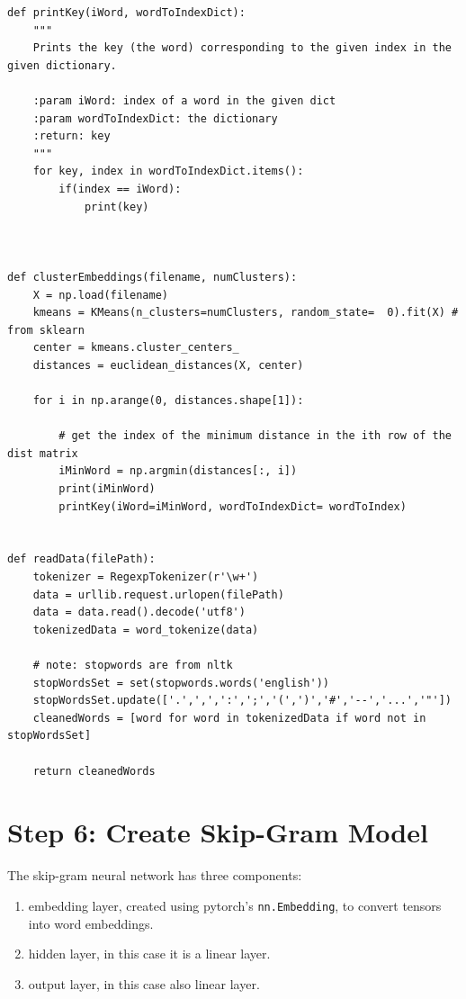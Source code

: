 \documentclass[
]{article}
\providecommand{\tightlist}{%
  \setlength{\itemsep}{0pt}\setlength{\parskip}{0pt}}
\begin{document}
\begin{verbatim}
def printKey(iWord, wordToIndexDict):
    """
    Prints the key (the word) corresponding to the given index in the given dictionary.

    :param iWord: index of a word in the given dict
    :param wordToIndexDict: the dictionary
    :return: key
    """
    for key, index in wordToIndexDict.items():
        if(index == iWord):
            print(key)



def clusterEmbeddings(filename, numClusters):
    X = np.load(filename)
    kmeans = KMeans(n_clusters=numClusters, random_state=  0).fit(X) # from sklearn
    center = kmeans.cluster_centers_
    distances = euclidean_distances(X, center)

    for i in np.arange(0, distances.shape[1]):

        # get the index of the minimum distance in the ith row of the dist matrix
        iMinWord = np.argmin(distances[:, i])
        print(iMinWord)
        printKey(iWord=iMinWord, wordToIndexDict= wordToIndex)


def readData(filePath):
    tokenizer = RegexpTokenizer(r'\w+')
    data = urllib.request.urlopen(filePath)
    data = data.read().decode('utf8')
    tokenizedData = word_tokenize(data)

    # note: stopwords are from nltk
    stopWordsSet = set(stopwords.words('english'))
    stopWordsSet.update(['.',',',':',';','(',')','#','--','...','"'])
    cleanedWords = [word for word in tokenizedData if word not in stopWordsSet]

    return cleanedWords
\end{verbatim}

\hypertarget{step-6-create-skip-gram-model}{%
\section{Step 6: Create Skip-Gram
Model}\label{step-6-create-skip-gram-model}}

The skip-gram neural network has three components:

\begin{enumerate}
\def\labelenumi{\arabic{enumi}.}
\tightlist
\item
  embedding layer, created using pytorch's
  \texttt{nn.Embedding}, to convert tensors into word
  embeddings.
\item
  hidden layer, in this case it is a linear layer.
\item
  output layer, in this case also linear layer.
\end{enumerate}
\end{document}
